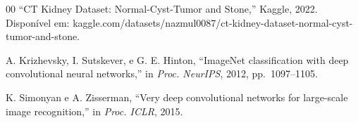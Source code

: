 \documentclass[conference]{IEEEtran}
\begin{document}
\begin{thebibliography}{00}
``CT Kidney Dataset: Normal-Cyst-Tumor and Stone,'' Kaggle, 2022.
Disponível em: kaggle.com/datasets/nazmul0087/\linebreak[1]
ct-kidney-dataset-normal-cyst-tumor-and-stone.

A. Krizhevsky, I. Sutskever, e G. E. Hinton,
``ImageNet classification with deep convolutional neural networks,''
in \textit{Proc. NeurIPS}, 2012, pp.~1097--1105.

K. Simonyan e A. Zisserman,
``Very deep convolutional networks for large-scale image recognition,''
in \textit{Proc. ICLR}, 2015.

\end{thebibliography}
\end{document}
